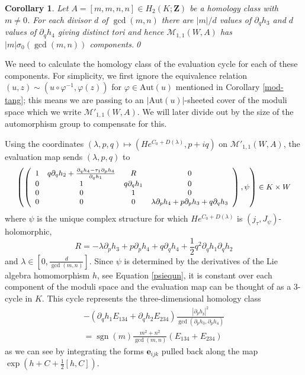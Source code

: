 \documentclass[11pt]{amsart}
\newcommand{\mM}{\mathcal{M}}
\newcommand{\ZZ}{\mathbf{Z}}
\newcommand{\Aut}{\mathrm{Aut}}
\newcommand{\WW}{W}
\newcommand{\zz}{\mathfrak{z}}
\renewcommand{\phi}{\varphi}
\newcommand{\OP}{\operatorname}
\numberwithin{equation}{section}
\newtheorem{cor}[equation]{Corollary}
\theoremstyle{definition}
\theoremstyle{remark}
\begin{document}
\begin{cor}
Let $A=[m,m,n,n]\in H_2(K;\ZZ)$ be a homology class with $m\neq 0$. For each divisor $d$ of $\gcd(m,n)$ there are $|m|/d$ values of $\partial_qh_3$ and $d$ values of $\partial_qh_4$ giving distinct tori and hence $\mM_{1,1}(\WW,A)$ has $|m|\sigma_0(\gcd(m,n))$ components.\qed
\end{cor}
We need to calculate the homology class of the evaluation cycle for each of these components. For simplicity, we first ignore the equivalence relation $(u,z)\sim (u\circ\phi^{-1},\phi(z))$ for $\phi\in\Aut(u)$ mentioned in Corollary \ref{mod-tang}; this means we are passing to an $|\Aut(u)|$-sheeted cover of the moduli space which we write $\mM'_{1,1}(\WW,A)$. We will later divide out by the size of the automorphism group to compensate for this.

Using the coordinates $(\lambda,p,q)\mapsto\left(He^{C_0+D(\lambda)},p+iq\right)$ on $\mM'_{1,1}(\WW,A)$, the evaluation map sends $(\lambda,p,q)$ to
\[\mbox{\small $
\left(\left(\begin{array}{cccc}
1 & q\partial_qh_2+\frac{\partial_qh_4-\tau_1\partial_ph_4}{\partial_qh_1} & R& 0\\
0 & 1 & q\partial_qh_1 & 0\\
0 & 0 & 1 & 0\\
0 & 0 & 0 & \lambda\partial_ph_4+p\partial_ph_3+q\partial_qh_3
\end{array}\right),\psi\right)\in K\times\WW$}
\]
where $\psi$ is the unique complex structure for which $He^{C_0+D(\lambda)}$ is $(j_{\tau},J_{\psi})$-holomorphic,
\[R=-\lambda\partial_ph_3+p\partial_ph_4+q\partial_qh_4+\frac{1}{2}q^2\partial_qh_1\partial_qh_2\]
and $\lambda\in\left[0,\frac{d}{\gcd(m,n)}\right]$. Since $\psi$ is determined by the derivatives of the Lie algebra homomorphism $h$, see Equation \eqref{psiequn}, it is constant over each component of the moduli space and the evaluation map can be thought of as a 3-cycle in $K$. This cycle represents the three-dimensional homology class
\begin{gather*}-(\partial_qh_1E_{134}+\partial_qh_2E_{234})\frac{|\partial_ph_{\zz}|^2}{\gcd(\partial_ph_3,\partial_ph_4)}\\
=\OP{sgn}(m)\frac{m^2+n^2}{\gcd(m,n)}(E_{134}+E_{234})\end{gather*}
as we can see by integrating the forms $\mathbf{e}_{ijk}$ pulled back along the map $\exp\left(h+C+\frac{1}{2}[h,C]\right)$.
\end{document}
